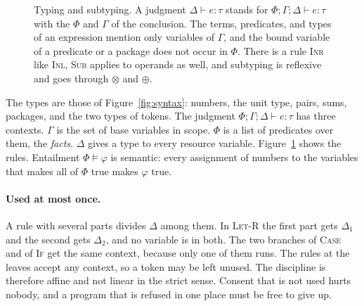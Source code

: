 \documentclass[acmsmall,nonacm,screen]{acmart}
\newcommand{\kw}[1]{\mathsf{#1}}
\newcommand{\Base}{\kw{Base}}
\newcommand{\Ok}[2]{\kw{Ok}_{#1}(#2)}
\newcommand{\Bud}[2]{\kw{Bud}_{#1}(#2)}
\newcommand{\act}[3]{\kw{act}\;#1\;#2\;#3}
\newcommand{\spend}[3]{\kw{spend}\;#1\;#2\;#3}
\newcommand{\splt}[2]{\kw{split}\;#1\;#2}
\newcommand{\run}[4]{\kw{run}_{#1 \multimap #2}(#3, #4)}
\newcommand{\iter}[4]{\kw{iter}\;#1\;\kw{from}\;#2\;\kw{as}\;#3.\,#4}
\newcommand{\monus}{\mathbin{\dot{-}}}
\begin{document}
\begin{figure}[t]
\caption{Typing and subtyping. A judgment $\Delta \vdash e : \tau$ stands for
$\Phi; \Gamma; \Delta \vdash e : \tau$ with the $\Phi$ and $\Gamma$ of the conclusion. The
terms, predicates, and types of an expression mention only variables of $\Gamma$, and the bound
variable of a predicate or a package does not occur in $\Phi$. There is a rule \textsc{Inr}
like \textsc{Inl}, \textsc{Sub} applies to operands as well, and subtyping is reflexive and
goes through $\otimes$ and $\oplus$.}
\label{fig:typing}
\end{figure}

The types are those of Figure~\ref{fig:syntax}: numbers, the unit type, pairs, sums, packages,
and the two types of tokens. The judgment $\Phi; \Gamma; \Delta \vdash e : \tau$ has three
contexts. $\Gamma$ is the set of base variables in scope. $\Phi$ is a list of predicates over
them, the \emph{facts}. $\Delta$ gives a type to every resource variable.
Figure~\ref{fig:typing} shows the rules. Entailment $\Phi \models \varphi$ is semantic: every
assignment of numbers to the variables that makes all of $\Phi$ true makes $\varphi$ true.

\paragraph{Used at most once.} A rule with several parts divides $\Delta$ among them. In
\textsc{Let-R} the first part gets $\Delta_1$ and the second gets $\Delta_2$, and no variable
is in both. The two branches of \textsc{Case} and of \textsc{If} get the same context, because
only one of them runs. The rules at the leaves accept any context, so a token may be left
unused. The discipline is therefore affine and not linear in the strict sense. Consent that is
not used hurts nobody, and a program that is refused in one place must be free to give up.
\end{document}
